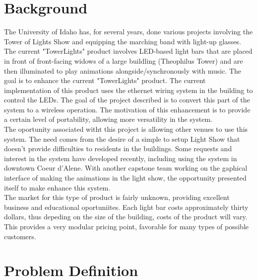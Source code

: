 \documentclass[12pt]{article}
\begin{document}
		\newpage
	
		\section{Background}
		The University of Idaho has, for several years, done various projects involving the Tower of Lights Show and equipping the marching band with light-up glasses. The current "TowerLights" product involves LED-based light bars that are placed in front of front-facing widows of a large buildling (Theophilus Tower) and are then illuminated to play animations alongside/synchronously with music. The goal is to enhance the current "TowerLights" product. The current implementation of this product uses the ethernet wiring system in the building to control the LEDs. The goal of the project described is to convert this part of the system to a wireless operation. The motivation of this enhancement is to provide a certain level of portability, allowing more versatility in the system.\\
		The oportunity associated witht this project is allowing other venues to use this system. The need comes from the desire of a simple to setup Light Show that doesn't provide difficulties to residents in the buildings. Some requests and interest in the system have developed recently, including using the system in downtown Coeur d'Alene. With another capstone team working on the gaphical interface of making the animations in the light show, the opportunity presented itself to make enhance this system.\\
		The market for this type of product is fairly unknown, providing excellent business and educational oportuniites. Each light bar costs approximately thirty dollars, thus depeding on the size of the building, costs of the product will vary. This provides a very modular pricing point, favorable for many types of possible customers.
		
		\newpage
	
		\section{Problem Definition}
		
\end{document}
